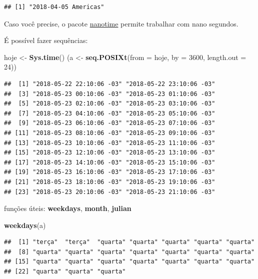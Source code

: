 \documentclass[]{book}
\newenvironment{Shaded}{\begin{snugshade}}{\end{snugshade}}
\newcommand{\KeywordTok}[1]{\textcolor[rgb]{0.13,0.29,0.53}{\textbf{#1}}}
\newcommand{\DataTypeTok}[1]{\textcolor[rgb]{0.13,0.29,0.53}{#1}}
\newcommand{\DecValTok}[1]{\textcolor[rgb]{0.00,0.00,0.81}{#1}}
\newcommand{\StringTok}[1]{\textcolor[rgb]{0.31,0.60,0.02}{#1}}
\newcommand{\NormalTok}[1]{#1}
\begin{document}
\begin{verbatim}
## [1] "2018-04-05 Americas"
\end{verbatim}

Caso você precise, o pacote
\href{https://github.com/eddelbuettel/nanotime}{nanotime} permite
trabalhar com nano segundos.

É possível fazer sequências:

\begin{Shaded}
\begin{Highlighting}[]
\NormalTok{hoje <-}\StringTok{ }\KeywordTok{Sys.time}\NormalTok{()}
\NormalTok{(a <-}\StringTok{ }\KeywordTok{seq.POSIXt}\NormalTok{(}\DataTypeTok{from =}\NormalTok{ hoje, }\DataTypeTok{by =} \DecValTok{3600}\NormalTok{, }\DataTypeTok{length.out =} \DecValTok{24}\NormalTok{))}
\end{Highlighting}
\end{Shaded}

\begin{verbatim}
##  [1] "2018-05-22 22:10:06 -03" "2018-05-22 23:10:06 -03"
##  [3] "2018-05-23 00:10:06 -03" "2018-05-23 01:10:06 -03"
##  [5] "2018-05-23 02:10:06 -03" "2018-05-23 03:10:06 -03"
##  [7] "2018-05-23 04:10:06 -03" "2018-05-23 05:10:06 -03"
##  [9] "2018-05-23 06:10:06 -03" "2018-05-23 07:10:06 -03"
## [11] "2018-05-23 08:10:06 -03" "2018-05-23 09:10:06 -03"
## [13] "2018-05-23 10:10:06 -03" "2018-05-23 11:10:06 -03"
## [15] "2018-05-23 12:10:06 -03" "2018-05-23 13:10:06 -03"
## [17] "2018-05-23 14:10:06 -03" "2018-05-23 15:10:06 -03"
## [19] "2018-05-23 16:10:06 -03" "2018-05-23 17:10:06 -03"
## [21] "2018-05-23 18:10:06 -03" "2018-05-23 19:10:06 -03"
## [23] "2018-05-23 20:10:06 -03" "2018-05-23 21:10:06 -03"
\end{verbatim}

funções úteis: \textbf{weekdays}, \textbf{month}, \textbf{julian}

\begin{Shaded}
\begin{Highlighting}[]
\KeywordTok{weekdays}\NormalTok{(a)}
\end{Highlighting}
\end{Shaded}

\begin{verbatim}
##  [1] "terça"  "terça"  "quarta" "quarta" "quarta" "quarta" "quarta"
##  [8] "quarta" "quarta" "quarta" "quarta" "quarta" "quarta" "quarta"
## [15] "quarta" "quarta" "quarta" "quarta" "quarta" "quarta" "quarta"
## [22] "quarta" "quarta" "quarta"
\end{verbatim}
\end{document}
